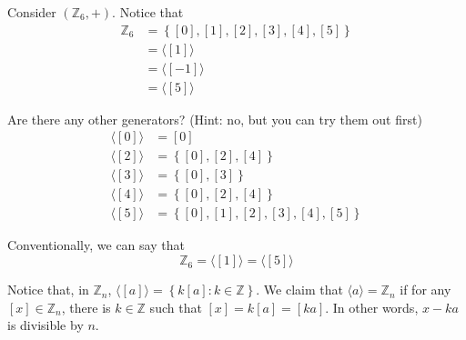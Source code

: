 \begin{nexample}
    Consider \((\mathbb{Z}_6, +)\). Notice that
    \[
    \begin{aligned}
        \mathbb{Z}_6 &= \left\{[0], [1], [2], [3], [4], [5]\right\} \\
                     &= \langle [1] \rangle \\
                     &= \langle [-1] \rangle \\
                     &= \langle [5] \rangle 
    \end{aligned}
    \]

    Are there any other generators? (Hint: no, but you can try them out first)
    \[
    \begin{aligned}
        \langle [0] \rangle &= [0] \\
        \langle [2] \rangle &= \left\{[0], [2], [4]\right\} \\
        \langle [3] \rangle &= \left\{[0], [3]\right\} \\
        \langle [4] \rangle &= \left\{[0], [2], [4]\right\} \\
        \langle [5] \rangle &= \left\{[0], [1], [2], [3], [4], [5]\right\}
    \end{aligned}
    \]

    Conventionally, we can say that
    \[
        \mathbb{Z}_6 = \langle [1] \rangle = \langle [5] \rangle
    \]
\end{nexample}

Notice that, in \(\mathbb{Z}_n\), \(\langle [a] \rangle = \left\{k[a] : k \in \mathbb{Z}\right\}\). We claim that \(\langle a \rangle = \mathbb{Z}_n\) if for any \([x] \in \mathbb{Z}_n\), there is \(k \in \mathbb{Z}\) such that \([x] = k[a] = [ka]\). In other words, \(x - ka\) is divisible by \(n\).
